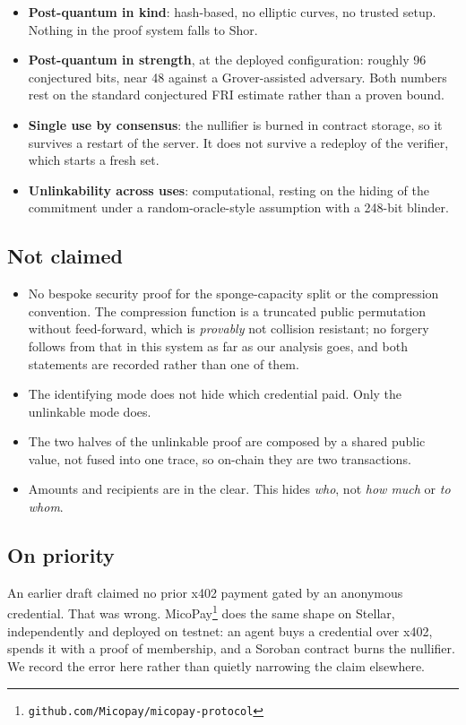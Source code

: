 \documentclass[11pt,a4paper]{article}
\begin{document}
\begin{itemize}
  \item \textbf{Post-quantum in kind}: hash-based, no elliptic curves, no
    trusted setup. Nothing in the proof system falls to Shor.
  \item \textbf{Post-quantum in strength}, at the deployed configuration:
    roughly 96 conjectured bits, near 48 against a Grover-assisted adversary.
    Both numbers rest on the standard conjectured FRI estimate rather than a
    proven bound.
  \item \textbf{Single use by consensus}: the nullifier is burned in contract
    storage, so it survives a restart of the server. It does not survive a
    redeploy of the verifier, which starts a fresh set.
  \item \textbf{Unlinkability across uses}: computational, resting on the
    hiding of the commitment under a random-oracle-style assumption with a
    248-bit blinder.
\end{itemize}

\subsection{Not claimed}

\begin{itemize}
  \item No bespoke security proof for the sponge-capacity split or the
    compression convention. The compression function is a truncated public
    permutation without feed-forward, which is \emph{provably} not collision
    resistant; no forgery follows from that in this system as far as our
    analysis goes, and both statements are recorded rather than one of them.
  \item The identifying mode does not hide which credential paid. Only the
    unlinkable mode does.
  \item The two halves of the unlinkable proof are composed by a shared public
    value, not fused into one trace, so on-chain they are two transactions.
  \item Amounts and recipients are in the clear. This hides \emph{who}, not
    \emph{how much} or \emph{to whom}.
\end{itemize}

\subsection{On priority}

An earlier draft claimed no prior x402 payment gated by an anonymous
credential. That was wrong. MicoPay\footnote{\texttt{github.com/Micopay/micopay-protocol}}
does the same shape on Stellar, independently and deployed on testnet: an agent
buys a credential over x402, spends it with a proof of membership, and a
Soroban contract burns the nullifier. We record the error here rather than
quietly narrowing the claim elsewhere.
\end{document}
